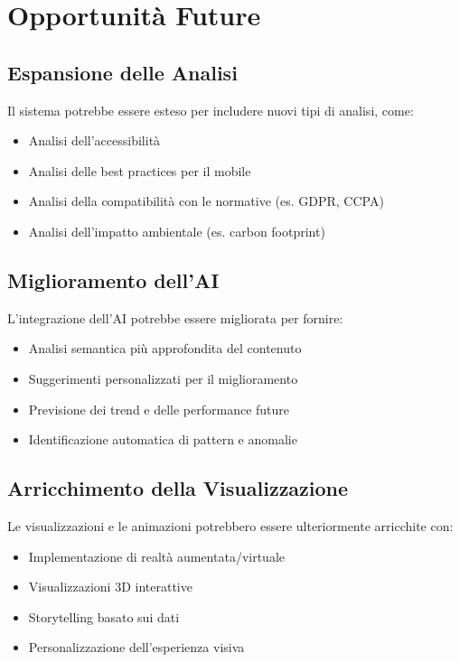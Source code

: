 \section{Opportunità Future}

\subsection{Espansione delle Analisi}
Il sistema potrebbe essere esteso per includere nuovi tipi di analisi, come:

\begin{itemize}
    \item Analisi dell'accessibilità
    \item Analisi delle best practices per il mobile
    \item Analisi della compatibilità con le normative (es. GDPR, CCPA)
    \item Analisi dell'impatto ambientale (es. carbon footprint)
\end{itemize}

\subsection{Miglioramento dell'AI}
L'integrazione dell'AI potrebbe essere migliorata per fornire:

\begin{itemize}
    \item Analisi semantica più approfondita del contenuto
    \item Suggerimenti personalizzati per il miglioramento
    \item Previsione dei trend e delle performance future
    \item Identificazione automatica di pattern e anomalie
\end{itemize}

\subsection{Arricchimento della Visualizzazione}
Le visualizzazioni e le animazioni potrebbero essere ulteriormente arricchite con:

\begin{itemize}
    \item Implementazione di realtà aumentata/virtuale
    \item Visualizzazioni 3D interattive
    \item Storytelling basato sui dati
    \item Personalizzazione dell'esperienza visiva
\end{itemize}

